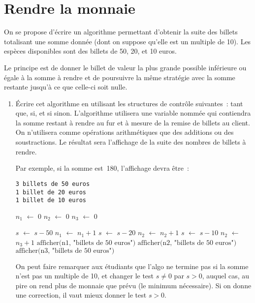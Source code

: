 \documentclass[10pt,a4paper]{article}
\newcommand*\Let[2]{\State #1 $\gets$ #2}
\begin{document}
\section{Rendre la monnaie}
On se propose d'écrire un algorithme permettant d'obtenir la suite des billets totalisant une somme donnée (dont on suppose qu'elle est un multiple de 10).
Les espèces disponibles sont des billets de 50, 20, et 10 euros.

Le principe est de donner le billet de valeur la plus grande possible inférieure ou égale à la somme à rendre et de poursuivre la même stratégie avec la somme restante jusqu'à ce que celle-ci soit nulle.

\begin{enumerate}
\item Écrire cet algorithme en utilisant les structures de contrôle suivantes~: tant que, si, et si sinon. L'algorithme utilisera une variable nommée qui contiendra la somme restant à rendre au fur et à mesure de la remise de billets au client. On n'utilisera comme opérations arithmétiques que des additions ou des soustractions. Le résultat sera l'affichage de la suite des nombres de billets à rendre.

Par exemple, si la somme est~180, l'affichage devra être~:

\begin{verbatim}
3 billets de 50 euros
1 billet de 20 euros
1 billet de 10 euros
\end{verbatim}

\begin{tcolorbox}
  \begin{algorithmic}[1]
    \Let{$n_1$}{$0$}
    \Let{$n_2$}{$0$}
    \Let{$n_3$}{$0$}

         \Let{$s$}{$s - 50$}
         \Let{$n_1$}{$n_1 + 1$}
      \Else 
                \Let{$s$}{$s - 20$}
                \Let{$n_2$}{$n_2 + 1$}
            \Else
                \Let{$s$}{$s - 10$}
                \Let{$n_2$}{$n_3 + 1$}
            \EndIf
       \EndIf
      \EndWhile
      \State $\text{afficher(n1, "billets de 50 euros")}$
      \State $\text{afficher(n2, "billets de 50 euros")}$
      \State $\text{afficher(n3, "billets de 50 euros")}$
    \EndFunction
  \end{algorithmic}
  
  On peut faire remarquer aux étudiants que l'algo ne termine pas si la somme n'est pas un multiple de 10, et changer le test $s\not= 0$ par $s>0$, auquel cas, au pire on rend plus de monnaie que prévu (le minimum nécessaire). Si on donne une correction, il vaut mieux donner le test $s>0$.
  

\end{tcolorbox}
\end{enumerate}
\end{document}

